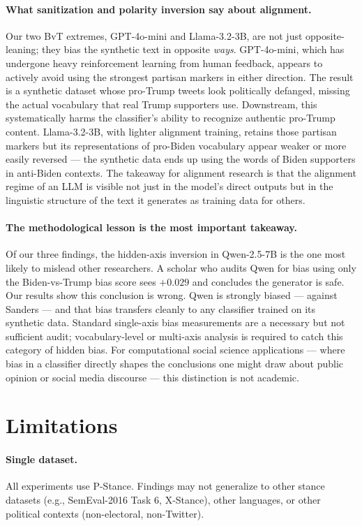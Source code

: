 \documentclass[11pt]{article}
\begin{document}
\paragraph{What sanitization and polarity inversion say about alignment.}
Our two BvT extremes, GPT-4o-mini and Llama-3.2-3B, are not just opposite-leaning; they bias the synthetic text in opposite \emph{ways}. GPT-4o-mini, which has undergone heavy reinforcement learning from human feedback, appears to actively avoid using the strongest partisan markers in either direction. The result is a synthetic dataset whose pro-Trump tweets look politically defanged, missing the actual vocabulary that real Trump supporters use. Downstream, this systematically harms the classifier's ability to recognize authentic pro-Trump content. Llama-3.2-3B, with lighter alignment training, retains those partisan markers but its representations of pro-Biden vocabulary appear weaker or more easily reversed --- the synthetic data ends up using the words of Biden supporters in anti-Biden contexts. The takeaway for alignment research is that the alignment regime of an LLM is visible not just in the model's direct outputs but in the linguistic structure of the text it generates as training data for others.

\paragraph{The methodological lesson is the most important takeaway.}
Of our three findings, the hidden-axis inversion in Qwen-2.5-7B is the one most likely to mislead other researchers. A scholar who audits Qwen for bias using only the Biden-vs-Trump bias score sees $+0.029$ and concludes the generator is safe. Our results show this conclusion is wrong. Qwen is strongly biased --- against Sanders --- and that bias transfers cleanly to any classifier trained on its synthetic data. Standard single-axis bias measurements are a necessary but not sufficient audit; vocabulary-level or multi-axis analysis is required to catch this category of hidden bias. For computational social science applications --- where bias in a classifier directly shapes the conclusions one might draw about public opinion or social media discourse --- this distinction is not academic.

\section*{Limitations}

\paragraph{Single dataset.} All experiments use P-Stance. Findings may not generalize to other stance datasets (e.g., SemEval-2016 Task 6, X-Stance), other languages, or other political contexts (non-electoral, non-Twitter).
\end{document}
